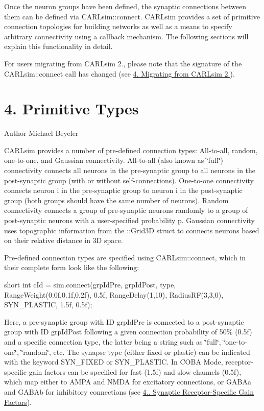 Once the neuron groups have been defined, the synaptic connections between them can be defined via C\+A\+R\+Lsim\+::connect. C\+A\+R\+Lsim provides a set of primitive connection topologies for building networks as well as a means to specify arbitrary connectivity using a callback mechanism. The following sections will explain this functionality in detail.

For users migrating from C\+A\+R\+Lsim 2., please note that the signature of the C\+A\+R\+Lsim\+::connect call has changed (see \hyperlink{ch4_connections_ch4s4_migrating_connect}{4. Migrating from C\+A\+R\+Lsim 2.}).\hypertarget{ch4_connections_ch4s1_primitive_types}{}\section{4. Primitive Types}\label{ch4_connections_ch4s1_primitive_types}
\begin{DoxyAuthor}{Author}
Michael Beyeler
\end{DoxyAuthor}
C\+A\+R\+Lsim provides a number of pre-\/defined connection types\+: All-\/to-\/all, random, one-\/to-\/one, and Gaussian connectivity. All-\/to-\/all (also known as \char`\"{}full\char`\"{}) connectivity connects all neurons in the pre-\/synaptic group to all neurons in the post-\/synaptic group (with or without self-\/connections). One-\/to-\/one connectivity connects neuron i in the pre-\/synaptic group to neuron i in the post-\/synaptic group (both groups should have the same number of neurons). Random connectivity connects a group of pre-\/synaptic neurons randomly to a group of post-\/synaptic neurons with a user-\/specified probability p. Gaussian connectivity uses topographic information from the \+::\+Grid3D struct to connects neurons based on their relative distance in 3D space.

Pre-\/defined connection types are specified using C\+A\+R\+Lsim\+::connect, which in their complete form look like the following\+: 
\begin{DoxyCode}
\textcolor{keywordtype}{short} \textcolor{keywordtype}{int} cId = sim.connect(grpIdPre, grpIdPost, type, RangeWeight(0.0f,0.1f,0.2f), 0.5f, RangeDelay(1,10),
    RadiusRF(3,3,0), SYN\_PLASTIC, 1.5f, 0.5f);
\end{DoxyCode}
 Here, a pre-\/synaptic group with ID {\ttfamily grp\+Id\+Pre} is connected to a post-\/synaptic group with ID {\ttfamily grp\+Id\+Post} following a given connection probability of 50\% (0.\+5f) and a specific connection {\ttfamily type}, the latter being a string such as \char`\"{}full\char`\"{}, \char`\"{}one-\/to-\/one\char`\"{}, \char`\"{}random\char`\"{}, etc. The synapse type (either fixed or plastic) can be indicated with the keyword {\ttfamily S\+Y\+N\+\_\+\+F\+I\+X\+ED} or {\ttfamily S\+Y\+N\+\_\+\+P\+L\+A\+S\+T\+IC}. In C\+O\+BA Mode, receptor-\/specific gain factors can be specified for fast (1.\+5f) and slow channels (0.\+5f), which map either to A\+M\+PA and N\+M\+DA for excitatory connections, or G\+A\+B\+Aa and G\+A\+B\+Ab for inhibitory connections (see \hyperlink{ch4_connections_ch4s1s4_receptor_gain}{4.. Synaptic Receptor-\/\+Specific Gain Factors}).

